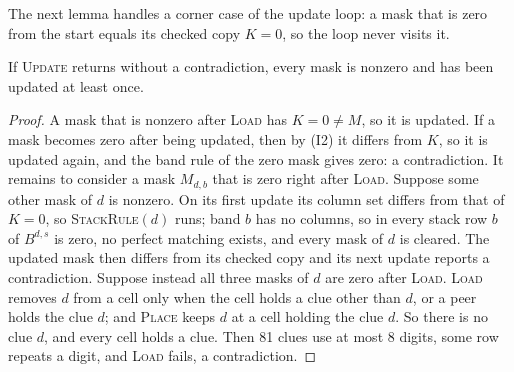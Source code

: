 The next lemma handles a corner case of the update loop: a mask that is zero from the start equals its checked copy
$K=0$, so the loop never visits it.

\begin{lemma}
\label{lem:nonzero}
If \textsc{Update} returns without a contradiction, every mask is nonzero and has been updated at least once.
\end{lemma}
\begin{proof}
A mask that is nonzero after \textsc{Load} has $K=0\neq M$, so it is updated. If a mask becomes zero after being
updated, then by (I2) it differs from $K$, so it is updated again, and the band rule of the zero mask gives zero: a
contradiction. It remains to consider a mask $M_{d,b}$ that is zero right after \textsc{Load}. Suppose some other mask
of $d$ is nonzero. On its first update its column set differs from that of $K=0$, so \textsc{StackRule}$(d)$ runs; band
$b$ has no columns, so in every stack row $b$ of $B^{d,s}$ is zero, no perfect matching exists, and every mask of $d$
is cleared. The updated mask then differs from its checked copy and its next update reports a contradiction. Suppose
instead all three masks of $d$ are zero after \textsc{Load}. \textsc{Load} removes $d$ from a cell only when the cell
holds a clue other than $d$, or a peer holds the clue $d$; and \textsc{Place} keeps $d$ at a cell holding the clue $d$.
So there is no clue $d$, and every cell holds a clue. Then 81 clues use at most 8 digits, some row repeats a digit, and
\textsc{Load} fails, a contradiction.
\end{proof}

